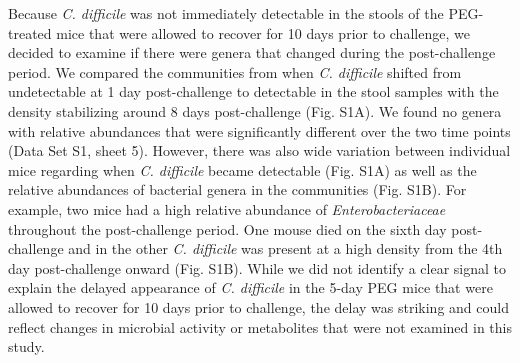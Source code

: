 \documentclass[
  11pt,
]{article}
\begin{document}
Because \emph{C. difficile} was not immediately detectable in the stools
of the PEG-treated mice that were allowed to recover for 10 days prior
to challenge, we decided to examine if there were genera that changed
during the post-challenge period. We compared the communities from when
\emph{C. difficile} shifted from undetectable at 1 day post-challenge to
detectable in the stool samples with the density stabilizing around 8
days post-challenge (Fig. S1A). We found no genera with relative
abundances that were significantly different over the two time points
(Data Set S1, sheet 5). However, there was also wide variation between
individual mice regarding when \emph{C. difficile} became detectable
(Fig. S1A) as well as the relative abundances of bacterial genera in the
communities (Fig. S1B). For example, two mice had a high relative
abundance of \emph{Enterobacteriaceae} throughout the post-challenge
period. One mouse died on the sixth day post-challenge and in the other
\emph{C. difficile} was present at a high density from the 4th day
post-challenge onward (Fig. S1B). While we did not identify a clear
signal to explain the delayed appearance of \emph{C. difficile} in the
5-day PEG mice that were allowed to recover for 10 days prior to
challenge, the delay was striking and could reflect changes in microbial
activity or metabolites that were not examined in this study.
\end{document}
